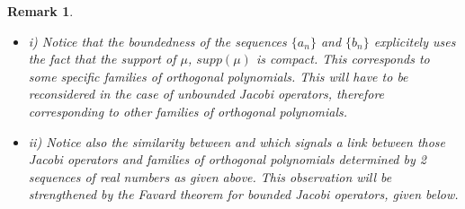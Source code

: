 \documentclass[10pt]{book}
\theoremstyle{break}
\newtheorem{remark}{Remark}
\begin{document}
\begin{remark} 

\begin{itemize}
\item i) Notice that the boundedness of the sequences $\{a_n\}$ and $\{b_n\}$ explicitely uses the fact that the support of $\mu$, $supp(\mu)$ is compact. This corresponds to some specific families of orthogonal polynomials. This will have to be reconsidered in the case of unbounded Jacobi operators, therefore corresponding to other families of orthogonal polynomials.
\item ii) Notice also the similarity between %
and %
which signals a link between those Jacobi operators and families of orthogonal polynomials determined by 2 sequences of real numbers as given above. This observation will be strengthened by the Favard theorem for bounded Jacobi operators, given below.
\end{itemize}
\end{remark}
\end{document}
